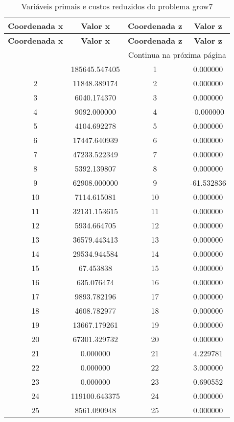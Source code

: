 \documentclass[12pt]{article}
\begin{document}
\begin{longtable}{@{}cccc@{}}
\caption{Variáveis primais e custos reduzidos do problema grow7} \\
\toprule
\textbf{Coordenada x} & \textbf{Valor x} & \textbf{Coordenada z} & \textbf{Valor z} \\
\midrule
\endfirsthead

\toprule
\textbf{Coordenada x} & \textbf{Valor x} & \textbf{Coordenada z} & \textbf{Valor z} \\
\midrule
\endhead

\midrule \multicolumn{4}{r}{{Continua na próxima página}} \\ \midrule
\endfoot

\bottomrule
\endlastfoot
1 & 185645.547405 & 1 & 0.000000 \\
2 & 11848.389174 & 2 & 0.000000 \\
3 & 6040.174370 & 3 & 0.000000 \\
4 & 9092.000000 & 4 & -0.000000 \\
5 & 4104.692278 & 5 & 0.000000 \\
6 & 17447.640939 & 6 & 0.000000 \\
7 & 47233.522349 & 7 & 0.000000 \\
8 & 5392.139807 & 8 & 0.000000 \\
9 & 62908.000000 & 9 & -61.532836 \\
10 & 7114.615081 & 10 & 0.000000 \\
11 & 32131.153615 & 11 & 0.000000 \\
12 & 5934.664705 & 12 & 0.000000 \\
13 & 36579.443413 & 13 & 0.000000 \\
14 & 29534.944584 & 14 & 0.000000 \\
15 & 67.453838 & 15 & 0.000000 \\
16 & 635.076474 & 16 & 0.000000 \\
17 & 9893.782196 & 17 & 0.000000 \\
18 & 4608.782977 & 18 & 0.000000 \\
19 & 13667.179261 & 19 & 0.000000 \\
20 & 67301.329732 & 20 & 0.000000 \\
21 & 0.000000 & 21 & 4.229781 \\
22 & 0.000000 & 22 & 3.000000 \\
23 & 0.000000 & 23 & 0.690552 \\
24 & 119100.643375 & 24 & 0.000000 \\
25 & 8561.090948 & 25 & 0.000000 \\

\end{longtable}
\end{document}
